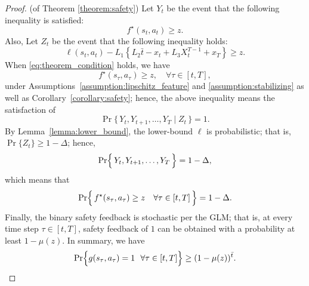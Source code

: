 \begin{proof}(of Theorem \ref{theorem:safety})
Let $Y_t$ be the event that the following inequality is satisfied:
%
\begin{equation}
    \label{eq:Y}
    f^\star(s_t, a_t) \ge z.
\end{equation}
%
Also, Let $Z_t$ be the event that the following inequality holds:
%
\begin{equation}
    \label{eq:theorem_condition}
    \ell(s_t, a_t) - L_1 \left\{L_2 \bar{t} - x_t + L_3 X_{t}^{T-1} + x_{T} \right\} \ge z.
\end{equation}
%
When \eqref{eq:theorem_condition} holds, we have
%
\begin{equation*}
    f^\star(s_\tau, a_\tau) \ge z, \quad \forall \tau \in [t, T],
\end{equation*}
%
under Assumptions~\ref{assumption:lipschitz_feature} and \ref{assumption:stabilizing} as well as Corollary~\ref{corollary:safety}; hence, the above inequality means the satisfaction of 
%
\begin{equation}
    \Pr\bigl\{\, Y_t, Y_{t+1}, \ldots, Y_T \mid Z_t \,\bigr\} = 1.
\end{equation}
%
By Lemma~\ref{lemma:lower_bound}, the lower-bound $\ell$ is probabilistic; that is, $\Pr\bigl\{Z_t\bigr\} \ge 1 - \Delta$; hence,
%
\begin{align*}
    \Pr\Bigl\{\, Y_t, Y_{t+1}, \ldots, Y_T \,\Bigr\} = 1 - \Delta,
\end{align*}
%
which means that
%
\begin{align*}
    \Pr\Bigl\{\, f^\star(s_\tau, a_\tau) \ge z \quad \forall \tau \in [t, T] \,\Bigr\} = 1 - \Delta.
\end{align*}
%
Finally, the binary safety feedback is stochastic per the GLM; that is, at every time step $\tau \in [t, T]$, safety feedback of $1$ can be obtained with a probability at least $1 - \mu(z)$.
In summary, we have 
%
\[
    \Pr \Bigl\{ g(s_\tau, a_\tau) = 1 \ \ \forall \tau \in [t, T] \Big\} \ge (1 - \mu(z))^{\bar{t}}.
\]
\end{proof}
